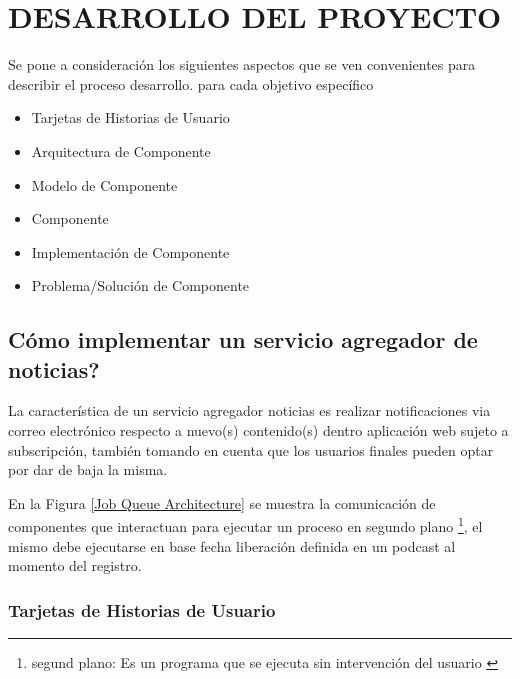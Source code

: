 \chapter{DESARROLLO DEL PROYECTO}

Se pone a consideraci\'{o}n los siguientes aspectos que se ven convenientes para
describir el proceso desarrollo. para cada objetivo espec\'{i}fico

\begin{itemize}

\item Tarjetas de Historias de Usuario
\item Arquitectura de Componente
\item Modelo de Componente
\item Componente
\item Implementaci\'{o}n de Componente
\item Problema/Soluci\'{o}n de Componente

\end{itemize}

\section{\textquestiondown C\'{o}mo implementar un servicio agregador de noticias?} \label{RSS}

La caracter\'{i}stica de un servicio agregador noticias es realizar notificaciones
via correo electr\'{o}nico respecto a nuevo(s) contenido(s) dentro aplicaci\'{o}n
web sujeto a subscripci\'{o}n, tambi\'{e}n tomando en cuenta que los usuarios 
finales pueden optar por dar de baja la misma. 

\begin{minipage}{1.0\textwidth}
	\centering
	\label{Job Queue Architecture}
\end{minipage}

En la Figura \ref{Job Queue Architecture} se muestra la comunicaci\'{o}n de
componentes que interactuan para ejecutar un proceso en segundo plano 
\footnote{segund plano: Es un programa que se ejecuta sin intervenci\'{o}n del
usuario \cite{background}}, el mismo debe ejecutarse en base fecha liberaci\'{o}n definida en un
podcast al momento del registro.   

\subsection{Tarjetas de Historias de Usuario}

